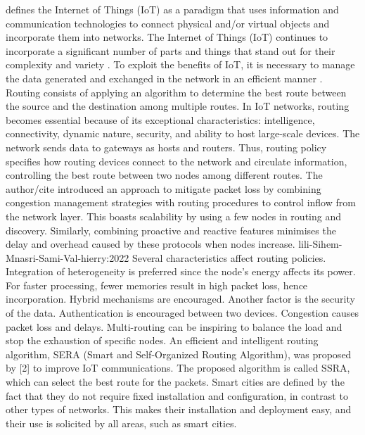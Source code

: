 \cite{plageras-psannis:2017} defines the Internet of Things (IoT) as a paradigm that uses information and communication 
technologies to connect physical and/or virtual objects and incorporate them into networks. The Internet of Things (IoT) 
continues to incorporate a significant number of parts and things that stand out for their complexity and variety 
\cite{amrioui-Sofiane-Hamrioui-Camil-Lloret-Jaime-Lorenz-Pascal:2018}. To exploit the benefits of IoT, it is necessary to manage 
the data generated and exchanged in the network in an efficient manner \cite{Tlili-Sihem-Mnasri-Sami-Val-hierry:2022}. 
Routing consists of applying an algorithm to determine the best route between the source and 
the destination among multiple routes. In IoT networks, routing becomes essential because of its exceptional characteristics: 
intelligence, connectivity, dynamic nature, security, and ability to host large-scale devices. The network sends data to gateways 
as hosts and routers\cite{:2019}. Thus, routing policy specifies how routing devices connect to 
the network and circulate information, controlling the best route between two nodes among different routes. The author/cite 
introduced an approach to mitigate packet loss by combining congestion management strategies with routing procedures to control
 inflow from the network layer. This boasts scalability by using a few nodes in routing and discovery. Similarly, combining 
 proactive and reactive features minimises the delay and overhead caused by these protocols when nodes increase. 
 lili-Sihem-Mnasri-Sami-Val-hierry:2022 Several characteristics affect routing policies. Integration of heterogeneity is 
 preferred since the node’s energy affects its power. For faster processing, fewer memories result in high packet loss, 
 hence incorporation. Hybrid mechanisms are encouraged. Another factor is the security of the data. Authentication is 
 encouraged between two devices. Congestion causes packet loss and delays. Multi-routing can be inspiring to balance the 
 load and stop the exhaustion of specific nodes. 
 An efficient and intelligent routing algorithm, SERA (Smart and Self-Organized Routing Algorithm), was proposed by [2] to 
 improve IoT communications. The proposed algorithm is called SSRA, which can select the best route for the packets. 
 Smart cities are defined by the fact that they do not require fixed installation and configuration, in contrast to other types
  of networks. This makes their installation and deployment easy, and their use is solicited by all areas, such as smart cities.
 
